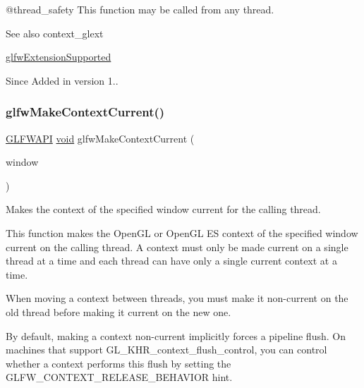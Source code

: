 @thread\+\_\+safety This function may be called from any thread.

\begin{DoxySeeAlso}{See also}
context\+\_\+glext 

\mbox{\hyperlink{group__context_ga9a28c712d35f9e43534e1d03b051c04c}{glfw\+Extension\+Supported}}
\end{DoxySeeAlso}
\begin{DoxySince}{Since}
Added in version 1.. 
\end{DoxySince}
\mbox{\label{group__context_gafd76c93e15ec8b0b90506a9936a46185}} 
\subsubsection{\texorpdfstring{glfwMakeContextCurrent()}{glfwMakeContextCurrent()}}
{\footnotesize\ttfamily \mbox{\hyperlink{glfw3_8h_a56da5036b2cc259351ae22fd6439bb47}{G\+L\+F\+W\+A\+PI}} \mbox{\hyperlink{glad_8h_a950fc91edb4504f62f1c577bf4727c29}{void}} glfw\+Make\+Context\+Current (\begin{DoxyParamCaption}\item[{\mbox{\hyperlink{group__window_ga3c96d80d363e67d13a41b5d1821f3242}{G\+L\+F\+Wwindow}} $\ast$}]{window }\end{DoxyParamCaption})}



Makes the context of the specified window current for the calling thread. 

This function makes the Open\+GL or Open\+GL ES context of the specified window current on the calling thread. A context must only be made current on a single thread at a time and each thread can have only a single current context at a time.

When moving a context between threads, you must make it non-\/current on the old thread before making it current on the new one.

By default, making a context non-\/current implicitly forces a pipeline flush. On machines that support {\ttfamily G\+L\+\_\+\+K\+H\+R\+\_\+context\+\_\+flush\+\_\+control}, you can control whether a context performs this flush by setting the G\+L\+F\+W\+\_\+\+C\+O\+N\+T\+E\+X\+T\+\_\+\+R\+E\+L\+E\+A\+S\+E\+\_\+\+B\+E\+H\+A\+V\+I\+OR hint.

